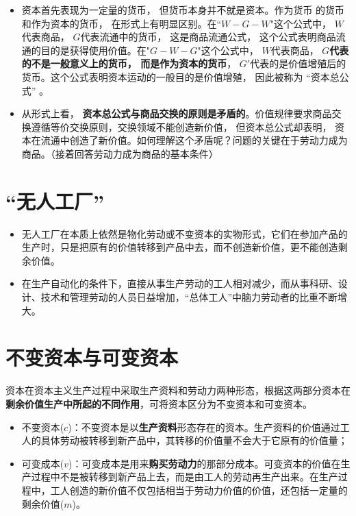 \documentclass[
]{article}
\begin{document}
\begin{itemize}
  \begin{itemize}
  \item
    资本首先表现为一定量的货币， 但货币本身并不就是资本。作为货币
    的货币和作为资本的货币，
    在形式上有明显区别。在``\(W-G-W\)"这个公式中， \(W\)代表商品，
    \(G\)代表流通中的货币， 这是商品流通公式，
    这个公式表明商品流通的目的是获得使用价值。在"\( G-W-G\)"这个公式中，
    \(W\)代表商品， \textbf{\(G\)代表的不是一般意义上的货币，
    而是作为资本的货币}，
    \(G'\)代表的是价值增殖后的货币。这个公式表明资本运动的一般目的是价值增殖，
    因此被称为 ``资本总公式'' 。
  \item
    从形式上看，
    \textbf{资本总公式与商品交换的原则是矛盾的}。价值规律要求商品交换遵循等价交换原则，交换领域不能创造新价值，
    但资本总公式却表明，
    资本在流通中创造了新价值。如何理解这个矛盾呢？问题的关键在于劳动力成为商品。（接着回答劳动力成为商品的基本条件）
  \end{itemize}
\end{itemize}

\hypertarget{ux65e0ux4ebaux5de5ux5382}{%
\section{``无人工厂''}\label{ux65e0ux4ebaux5de5ux5382}}

\begin{itemize}
\item
  无人工厂在本质上依然是物化劳动或不变资本的实物形式，它们在参加产品的生产时，只是把原有的价值转移到产品中去，而不创造新价值，更不能创造剩余价值。
\item
  在生产自动化的条件下，直接从事生产劳动的工人相对减少，而从事科研、设计、技术和管理劳动的人员日益增加，``总体工人''中脑力劳动者的比重不断增大。
\end{itemize}

\hypertarget{ux4e0dux53d8ux8d44ux672cux4e0eux53efux53d8ux8d44ux672c}{%
\section{不变资本与可变资本}\label{ux4e0dux53d8ux8d44ux672cux4e0eux53efux53d8ux8d44ux672c}}

资本在资本主义生产过程中采取生产资料和劳动力两种形态，根据这两部分资本在\textbf{剩余价值生产中所起的不同作用}，可将资本区分为不变资本和可变资本。

\begin{itemize}
\item
  不变资本(\(c\))：不变资本是以\textbf{生产资料}形态存在的资本。生产资料的价值通过工人的具体劳动被转移到新产品中，其转移的价值量不会大于它原有的价值量；
\item
  可变成本(\(v\))：可变成本是用来\textbf{购买劳动力}的那部分成本。可变资本的价值在生产过程中不是被转移到新产品上去，而是由工人的劳动再生产出来。在生产过程中，工人创造的新价值不仅包括相当于劳动力价值的价值，还包括一定量的剩余价值(\(m\))。
\end{itemize}
\end{document}
